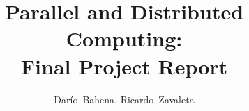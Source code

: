 \documentclass[11pt]{book}
\begin{document}
\title{Parallel and Distributed Computing: \\ Final Project Report}
\author{Darío~Bahena, Ricardo~Zavaleta}
\maketitle
\tableofcontents
\newpage





\nocite{*}


\end{document}
